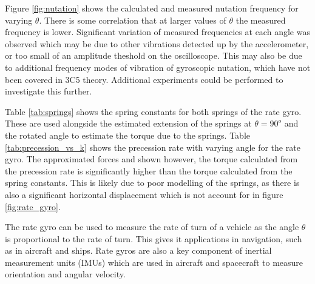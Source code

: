 \documentclass[8pt]{article}
\begin{document}


Figure \ref{fig:nutation} shows the calculated and measured nutation frequency for varying $\theta$.
There is some correlation that at larger values of $\theta$ the measured frequency is lower.
Significant variation of measured frequencies at each angle was observed which may be due to other vibrations
detected up by the accelerometer, or too small of an amplitude theshold on the oscilloscope. This may
also be due to additional frequency modes of vibration of gyroscopic nutation, which have not been covered in 3C5 theory.
Additional experiments could be performed to investigate this further.



Table \ref{tab:springs} shows the spring constants for both springs of the rate gyro.
These are used alongside the estimated extension of the springs at $\theta = 90^o$ and the rotated angle to estimate the torque due to the springs.
Table \ref{tab:precession_vs_k} shows the precession rate with varying angle for the rate gyro.
The approximated forces and shown however, the torque calculated from the precession rate is significantly higher than the torque calculated from the spring constants.
This is likely due to poor modelling of the springs, as there is also a significant horizontal displacement which is not account for in figure \ref{fig:rate_gyro}. 

The rate gyro can be used to measure the rate of turn of a vehicle as the angle $\theta$ is proportional to the rate of turn.
This gives it applications in navigation, such as in aircraft and ships.
Rate gyros are also a key component of inertial measurement units (IMUs) which are used in aircraft and spacecraft to measure orientation and angular velocity.
\end{document}
